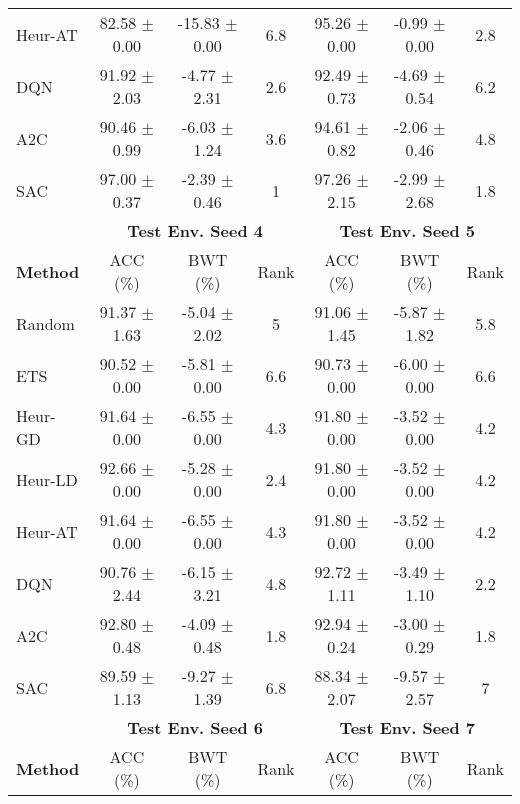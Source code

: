 \begin{tabular}{lcccccc}
	Heur-AT         & 82.58 $\pm$ 0.00   & -15.83 $\pm$ 0.00   & 6.8    & 95.26 $\pm$ 0.00   & -0.99 $\pm$ 0.00    & 2.8    \\
	DQN             & 91.92 $\pm$ 2.03   & -4.77 $\pm$ 2.31    & 2.6    & 92.49 $\pm$ 0.73   & -4.69 $\pm$ 0.54    & 6.2    \\
	A2C             & 90.46 $\pm$ 0.99   & -6.03 $\pm$ 1.24    & 3.6    & 94.61 $\pm$ 0.82   & -2.06 $\pm$ 0.46    & 4.8    \\
	SAC             & 97.00 $\pm$ 0.37   & -2.39 $\pm$ 0.46    & 1      & 97.26 $\pm$ 2.15   & -2.99 $\pm$ 2.68    & 1.8    \\
	\midrule 
	& \multicolumn{3}{c}{\textbf{Test Env. Seed 4}} & \multicolumn{3}{c}{\textbf{Test Env. Seed 5}} \\
	\cmidrule(lr){2-4} \cmidrule(lr){5-7}
	\textbf{Method} & ACC (\%)         & BWT (\%)          & Rank   & ACC (\%)         & BWT (\%)          & Rank   \\
	\midrule 
	Random          & 91.37 $\pm$ 1.63   & -5.04 $\pm$ 2.02    & 5      & 91.06 $\pm$ 1.45   & -5.87 $\pm$ 1.82    & 5.8    \\
	ETS             & 90.52 $\pm$ 0.00   & -5.81 $\pm$ 0.00    & 6.6    & 90.73 $\pm$ 0.00   & -6.00 $\pm$ 0.00    & 6.6    \\
	Heur-GD         & 91.64 $\pm$ 0.00   & -6.55 $\pm$ 0.00    & 4.3    & 91.80 $\pm$ 0.00   & -3.52 $\pm$ 0.00    & 4.2    \\
	Heur-LD         & 92.66 $\pm$ 0.00   & -5.28 $\pm$ 0.00    & 2.4    & 91.80 $\pm$ 0.00   & -3.52 $\pm$ 0.00    & 4.2    \\
	Heur-AT         & 91.64 $\pm$ 0.00   & -6.55 $\pm$ 0.00    & 4.3    & 91.80 $\pm$ 0.00   & -3.52 $\pm$ 0.00    & 4.2    \\
	DQN             & 90.76 $\pm$ 2.44   & -6.15 $\pm$ 3.21    & 4.8    & 92.72 $\pm$ 1.11   & -3.49 $\pm$ 1.10    & 2.2    \\
	A2C             & 92.80 $\pm$ 0.48   & -4.09 $\pm$ 0.48    & 1.8    & 92.94 $\pm$ 0.24   & -3.00 $\pm$ 0.29    & 1.8    \\
	SAC             & 89.59 $\pm$ 1.13   & -9.27 $\pm$ 1.39    & 6.8    & 88.34 $\pm$ 2.07   & -9.57 $\pm$ 2.57    & 7      \\
	\midrule 
	& \multicolumn{3}{c}{\textbf{Test Env. Seed 6}} & \multicolumn{3}{c}{\textbf{Test Env. Seed 7}} \\
	\cmidrule(lr){2-4} \cmidrule(lr){5-7}
	\textbf{Method} & ACC (\%)         & BWT (\%)          & Rank   & ACC (\%)         & BWT (\%)          & Rank   \\

\end{tabular}
